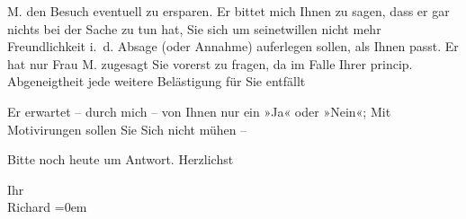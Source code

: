                   M. den Besuch \introOben{}eventuell\introOben{} zu ersparen. Er bittet mich Ihnen zu sagen, dass er gar nichts
               bei der Sache zu tun hat, Sie sich um seinetwillen nicht mehr {\pb}Freundlichkeit i. d. Absage (oder
               Annahme) auferlegen sollen, als  Ihnen passt. Er
               hat nur Frau M. zugesagt Sie vorerst zu
               fragen, da im Falle Ihrer princip. Abgeneigtheit jede weitere Belästigung für Sie
               entfällt\pend
           
\pstart
           Er erwartet – durch mich – von Ihnen nur ein »Ja« oder »Nein«; \introOben{}Mit\introOben{} Motivirungen sollen Sie Sich nicht mühen –\pend
           
\pstart
           Bitte noch heute um Antwort. Herzlichst\pend
           
\pstart
           Ihr{\\[\baselineskip]}\spacefill\mbox{Richard}\pend
           \leftskip=0em{}\endnumbering{}  
      